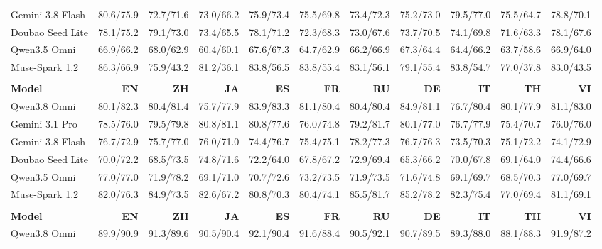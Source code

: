 \begin{table}[htbp]
\begin{tabular*}{\linewidth}{@{}l@{\hspace{3pt}\extracolsep{\fill}}*{10}{r}@{}}
Gemini 3.8 Flash & 80.6/75.9 & 72.7/71.6 & 73.0/66.2 & 75.9/73.4 & 75.5/69.8 & 73.4/72.3 & 75.2/73.0 & 79.5/77.0 & 75.5/64.7 & 78.8/70.1 \\
Doubao Seed Lite & 78.1/75.2 & 79.1/73.0 & 73.4/65.5 & 78.1/71.2 & 72.3/68.3 & 73.0/67.6 & 73.7/70.5 & 74.1/69.8 & 71.6/63.3 & 78.1/67.6 \\
Qwen3.5 Omni & 66.9/66.2 & 68.0/62.9 & 60.4/60.1 & 67.6/67.3 & 64.7/62.9 & 66.2/66.9 & 67.3/64.4 & 64.4/66.2 & 63.7/58.6 & 66.9/64.0 \\
Muse-Spark 1.2 & 86.3/66.9 & 75.9/43.2 & 81.2/36.1 & 83.8/56.5 & 83.8/55.4 & 83.1/56.1 & 79.1/55.4 & 83.8/54.7 & 77.0/37.8 & 83.0/43.5 \\
\addlinespace[3pt]
\midrule
\multicolumn{11}{@{}l}{\textbf{Self Coherence (SC)}} \\
\textbf{Model} & \textbf{EN} & \textbf{ZH} & \textbf{JA} & \textbf{ES} & \textbf{FR} & \textbf{RU} & \textbf{DE} & \textbf{IT} & \textbf{TH} & \textbf{VI} \\
\midrule
Qwen3.8 Omni & 80.1/82.3 & 80.4/81.4 & 75.7/77.9 & 83.9/83.3 & 81.1/80.4 & 80.4/80.4 & 84.9/81.1 & 76.7/80.4 & 80.1/77.9 & 81.1/83.0 \\
Gemini 3.1 Pro & 78.5/76.0 & 79.5/79.8 & 80.8/81.1 & 80.8/77.6 & 76.0/74.8 & 79.2/81.7 & 80.1/77.0 & 76.7/77.9 & 75.4/70.7 & 76.0/76.0 \\
Gemini 3.8 Flash & 76.7/72.9 & 75.7/77.0 & 76.0/71.0 & 74.4/76.7 & 75.4/75.1 & 78.2/77.3 & 76.7/76.3 & 73.5/70.3 & 75.1/72.2 & 74.1/72.9 \\
Doubao Seed Lite & 70.0/72.2 & 68.5/73.5 & 74.8/71.6 & 72.2/64.0 & 67.8/67.2 & 72.9/69.4 & 65.3/66.2 & 70.0/67.8 & 69.1/64.0 & 74.4/66.6 \\
Qwen3.5 Omni & 77.0/77.0 & 71.9/78.2 & 69.1/71.0 & 70.7/72.6 & 73.2/73.5 & 71.9/73.5 & 71.6/74.8 & 69.1/69.7 & 68.5/70.3 & 77.0/69.7 \\
Muse-Spark 1.2 & 82.0/76.3 & 84.9/73.5 & 82.6/67.2 & 80.8/70.3 & 80.4/74.1 & 85.5/81.7 & 85.2/78.2 & 82.3/75.4 & 77.0/69.4 & 81.1/69.1 \\
\addlinespace[3pt]
\midrule
\multicolumn{11}{@{}l}{\textbf{Voice Editing (VE)}} \\
\textbf{Model} & \textbf{EN} & \textbf{ZH} & \textbf{JA} & \textbf{ES} & \textbf{FR} & \textbf{RU} & \textbf{DE} & \textbf{IT} & \textbf{TH} & \textbf{VI} \\
\midrule
Qwen3.8 Omni & 89.9/90.9 & 91.3/89.6 & 90.5/90.4 & 92.1/90.4 & 91.6/88.4 & 90.5/92.1 & 90.7/89.5 & 89.3/88.0 & 88.1/88.3 & 91.9/87.2 \\

\end{tabular*}
\end{table}

